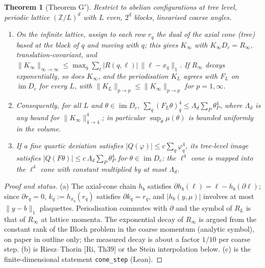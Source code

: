 \documentclass[11pt,a4paper]{article}
\newtheorem{theorem}{Theorem}[section]
\theoremstyle{definition}
\theoremstyle{remark}
\newcommand{\code}[1]{\texttt{#1}}
\newcommand{\im}{\operatorname{im}}
\begin{document}
\begin{theorem}[Theorem G$'$]\label{thm:Gp}
Restrict to abelian configurations at tree level, periodic lattice $(\mathbb{Z}/L)^d$ with $L$ even, $2^d$ blocks, linearised coarse angles.
\begin{enumerate}[label=(\alph*)]
\item On the infinite lattice, assign to each row $r_q$ the dual of the axial cone (tree) based at the block of $q$ and moving with $q$; this gives $K_\infty$ with $K_\infty D_c=R_\infty$, translation-covariant, and $\|K_\infty\|_{\infty\to\infty}\le\max_q\sum_\ell|R(q,\ell)|\,\|\ell-x_q\|_1$. If $R_\infty$ decays exponentially, so does $K_\infty$, and the periodisation $K_L$ agrees with $F_L$ on $\im D_c$ for every $L$, with $\|K_L\|_{p\to p}\le\|K_\infty\|_{p\to p}$ for $p=1,\infty$.
\item Consequently, for all $L$ and $\theta\in\im D_c$, $\sum_q(F_L\theta)_q^4\le\Lambda_d\sum_P\theta_P^4$, where $\Lambda_d$ is any bound for $\|K_\infty\|_{4\to4}^4$; in particular $\sup_\theta\mu(\theta)$ is bounded uniformly in the volume.
\item If a fine quartic deviation satisfies $|Q(\varphi)|\le c\sum_q\varphi_q^4$, its tree-level image satisfies $|Q(F\theta)|\le c\,\Lambda_d\sum_P\theta_P^4$ for $\theta\in\im D_c$: the $\ell^4$ cone is mapped into the $\ell^4$ cone with constant multiplied by at most $\Lambda_d$.
\end{enumerate}
\end{theorem}

\begin{proof}[Proof and status]
(a) The axial-cone chain $h_b$ satisfies $\partial h_b(\ell)=\ell-h_b(\partial\ell)$; since $\partial r_q=0$, $k_q:=h_{x_q}(r_q)$ satisfies $\partial k_q=r_q$, and $|h_b(y,\mu)|$ involves at most $\|y-b\|_1$ plaquettes. Periodisation commutes with $\partial$ and the symbol of $R_L$ is that of $R_\infty$ at lattice momenta. The exponential decay of $R_\infty$ is argued from the constant rank of the Bloch problem in the coarse momentum (analytic symbol), on paper in outline only; the measured decay is about a factor $1/10$ per coarse step. (b) is Riesz--Thorin [Ri, Th39] or the Stein interpolation below. (c) is the finite-dimensional statement \code{cone\_step} (Lean).
\end{proof}
\end{document}
